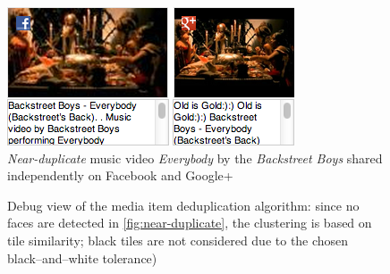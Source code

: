 \begin{figure}[!ht]
  \centering
  \includegraphics[width=0.9\linewidth]{./backstreetboys.png}
  \caption[\emph{Near-duplicate} music video \emph{Everybody} by the \emph{Backstreet Boys}]{\emph{Near-duplicate} music video \emph{Everybody} by the \emph{Backstreet Boys} shared independently on Facebook and Google+}
  \label{fig:near-duplicate}
\end{figure}

\begin{figure}[!ht]
  \centering
  \caption[Debug view of the media item deduplication algorithm]{Debug view of the media item deduplication algorithm:
  since no faces are detected in \autoref{fig:near-duplicate},
  the clustering is based on tile similarity;
  black tiles are not considered due to the chosen black--and--white tolerance)}
  \label{fig:algorithmdebugtilesimilarity}
\end{figure}

